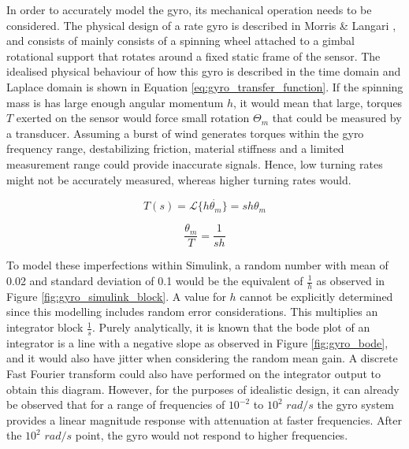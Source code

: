 In order to accurately model the gyro, its mechanical operation needs to be considered. The physical design of a rate gyro is described in Morris \& Langari \cite{MORRIS2016599}, and consists of mainly consists of a spinning wheel attached to a gimbal rotational support that rotates around a fixed static frame of the sensor. The idealised physical behaviour of how this gyro is described in the time domain and Laplace domain is shown in Equation \ref{eq:gyro_transfer_function}. If the spinning mass is has large enough angular momentum $h$, it would mean that large, torques $T$ exerted on the sensor would force small rotation $\Theta_m$ that could be measured by a transducer. Assuming a burst of wind generates torques within the gyro frequency range, destabilizing friction, material stiffness and a limited measurement range could provide inaccurate signals. Hence, low turning rates might not be accurately measured, whereas higher turning rates would.

\begin{equation}
T(s) = {\mathcal {L}}\{h\dot{\theta_m}\} = sh\theta_m
\label{eq:gyro_transfer_function}
\end{equation}

\begin{equation}
\frac{\theta_m}{T} = \frac{1}{sh}
\end{equation}

To model these imperfections within Simulink, a random number with mean of 0.02 and standard deviation of 0.1 would be the equivalent of $\frac{1}{h}$ as observed in Figure \ref{fig:gyro_simulink_block}. A value for $h$ cannot be explicitly determined since this modelling includes random error considerations. This multiplies an integrator block $\frac{1}{s}$. Purely analytically, it is known that the bode plot of an integrator is a line with a negative slope as observed in Figure \ref{fig:gyro_bode}, and it would also have jitter when considering the random mean gain. A discrete Fast Fourier transform could also have performed on the integrator output to obtain this diagram. However, for the purposes of idealistic design, it can already be observed that for a range of frequencies of $10^{-2}$ to $10^{2}$ $rad/s$ the gyro system provides a linear magnitude response with attenuation at faster frequencies. After the $10^{2}$ $rad/s$ point, the gyro would not respond to higher frequencies.



